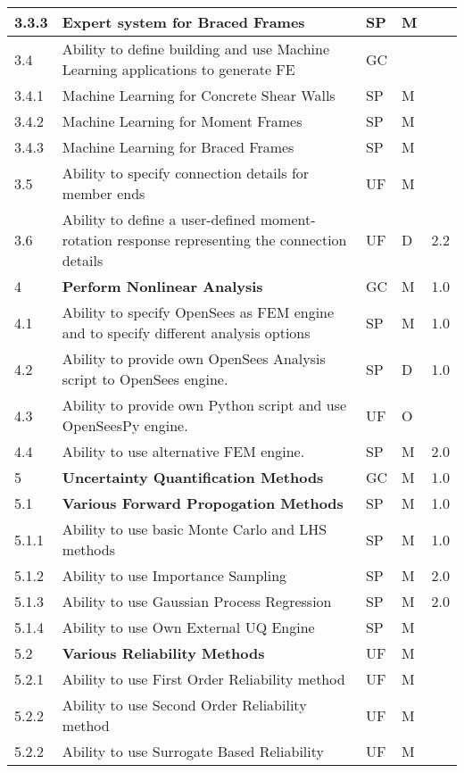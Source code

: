\begin{longtable}{| p{} | p{} | p{} | p{} |  p{} |}
  3.3.3 & Expert system for  Braced Frames & SP & M &   \\ \hline
  3.4 & Ability to define building and use Machine Learning applications to generate FE & GC &  &  \\ \hline
  3.4.1 & Machine Learning for Concrete Shear Walls & SP & M &  \\ \hline
  3.4.2 & Machine Learning for Moment Frames & SP & M &  \\ \hline
  3.4.3 & Machine Learning for Braced Frames & SP & M &   \\ \hline
  3.5 & Ability to specify connection details for member ends & UF & M &  \\ \hline
  3.6 & Ability to define a user-defined moment-rotation response representing the connection details & UF & D & 2.2 \\ \hline
  4 & \textbf{Perform Nonlinear Analysis} & GC & M & 1.0 \\ \hline
  4.1 & Ability to specify OpenSees as FEM engine and to specify different analysis options & SP & M & 1.0 \\ \hline
  4.2 & Ability to provide own OpenSees Analysis script to OpenSees engine. & SP & D & 1.0 \\ \hline
  4.3 & Ability to provide own Python script and use OpenSeesPy engine. & UF & O &  \\ \hline
  4.4 & Ability to use alternative FEM engine. & SP & M & 2.0 \\ \hline
  5 & \textbf{Uncertainty Quantification Methods} &  GC & M & 1.0  \\ \hline
  5.1 & \textbf{Various Forward Propogation Methods} & SP & M & 1.0  \\ \hline
  5.1.1 & Ability to use basic  Monte Carlo and LHS methods & SP & M & 1.0 \\ \hline
  5.1.2 & Ability to use Importance Sampling  & SP & M & 2.0 \\ \hline
  5.1.3 & Ability to use Gaussian Process Regression & SP & M & 2.0 \\ \hline
  5.1.4 & Ability to use Own External UQ Engine & SP & M &  \\ \hline
  5.2 & \textbf{Various Reliability Methods} & UF & M &  \\ \hline
  5.2.1 & Ability to use First Order Reliability method & UF & M &  \\ \hline
  5.2.2 & Ability to use Second Order Reliability method & UF & M & \\ \hline
  5.2.2 & Ability to use Surrogate Based Reliability & UF & M & \\ \hline

\end{longtable}
